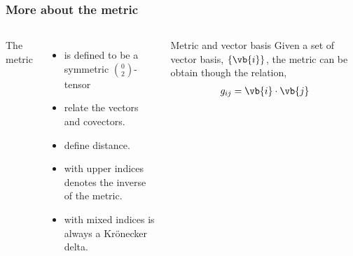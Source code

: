 {
  \begin{frame}
    \titlepage
  \end{frame}
}


\begin{frame}
  \frametitle{More about the metric}
  \begin{columns}[t]
    The metric
    \begin{itemize}
    \item  is defined to be a symmetric $\binom{0}{2}$-tensor
    \item relate the vectors and covectors.
    \item define distance.
    \item with upper indices denotes the inverse of the metric.
    \item with mixed indices is \alert{always} a Kr\"onecker delta.
    \end{itemize}
    \begin{block}{Metric and vector basis}
      Given a set of vector basis, $\{\vb{i}\}$, the metric can be obtain though the relation,
      \begin{align*}
        g_{i j} = \vb{i}\cdot \vb{j}
      \end{align*}
    \end{block}
  \end{columns}
\end{frame}




